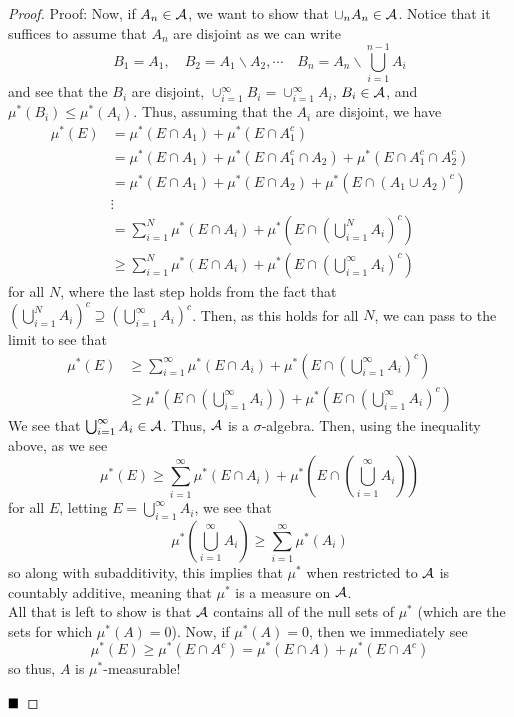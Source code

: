 \begin{proof}{Proof:}
    Now, if $A_n \in \cal{A}$, we want to show that $\cup_{n} A_n \in \cal{A}$. Notice that it suffices to assume that $A_n$ are disjoint as we can write
    \[ B_1 = A_1,\quad B_2 = A_1 \backslash A_2,\cdots \quad B_n = A_n \backslash \bigcup_{i = 1}^{n - 1} A_i \]
    and see that the $B_i$ are disjoint, $\cup_{i = 1}^{\infty} B_i = \cup_{i = 1}^{\infty} A_i$, $B_i \in \cal{A}$, and $\mu^{*}(B_i) \leq \mu^{*}(A_i)$. Thus, assuming that the $A_i$ are disjoint, we have
    \begin{align*}
        \mu^{*}(E) &= \mu^{*}(E \cap A_1) + \mu^{*}(E \cap A_1^{c})\\
        &= \mu^{*}(E \cap A_1) + \mu^{*}(E \cap A_1^c \cap A_2) + \mu^{*}(E \cap A_1^{c} \cap A_2^{c})\\
        &= \mu^{*}(E \cap A_1) + \mu^{*}(E \cap A_2) + \mu^{*}(E \cap (A_1 \cup A_2)^{c})\\
        &\vdots\\
        &= \sum_{i = 1}^{N} \mu^{*}(E \cap A_i) + \mu^{*}\left(E \cap \left(\bigcup_{i = 1}^{N} A_i\right)^{c}\right)\\
        &\geq \sum_{i = 1}^{N} \mu^{*}(E \cap A_i) + \mu^{*}\left(E \cap \left(\bigcup_{i = 1}^{\infty} A_i\right)^{c}\right)
    \end{align*}
    for all $N$, where the last step holds from the fact that $\left(\bigcup_{i = 1}^{N} A_i\right)^{c} \supseteq \left(\bigcup_{i = 1}^{\infty} A_i\right)^{c}$. Then, as this holds for all $N$, we can pass to the limit to see that
    \begin{align*}
        \mu^{*}(E) &\geq \sum_{i = 1}^{\infty} \mu^{*}(E \cap A_i) + \mu^{*}\left(E \cap \left(\bigcup_{i = 1}^{\infty} A_i\right)^{c}\right)\\
        &\geq \mu^{*}\left(E \cap \left(\bigcup_{i = 1}^{\infty} A_i\right)\right) + \mu^{*}\left(E \cap \left(\bigcup_{i = 1}^{\infty} A_i\right)^{c}\right)
    \end{align*}
    We see that $\bigcup_{i = 1}^{\infty} A_i \in \cal{A}$. Thus, $\cal{A}$ is a $\sigma$-algebra. Then, using the inequality above, as we see
    \[ \mu^{*}(E) \geq \sum_{i = 1}^{\infty} \mu^{*}(E \cap A_i) + \mu^{*}\left(E \cap \left(\bigcup_{i = 1}^{\infty} A_i\right)\right) \]
    for all $E$, letting $E = \bigcup_{i = 1}^{\infty} A_i$, we see that
    \[ \mu^{*}\left(\bigcup_{i = 1}^{\infty} A_i\right) \geq \sum_{i = 1}^{\infty} \mu^{*}(A_i) \]
    so along with subadditivity, this implies that $\mu^{*}$ when restricted to $\cal{A}$ is countably additive, meaning that $\mu^{*}$ is a measure on $\cal{A}$.\\

    All that is left to show is that $\cal{A}$ contains all of the null sets of $\mu^{*}$ (which are the sets for which $\mu^{*}(A) = 0$). Now, if $\mu^{*}(A) = 0$, then we immediately see
    \[ \mu^{*}(E) \geq \mu^{*}(E \cap A^{c}) = \mu^{*}(E \cap A) + \mu^{*}(E \cap A^{c}) \]
    so thus, $A$ is $\mu^{*}$-measurable!

    $\qed$
\end{proof}

